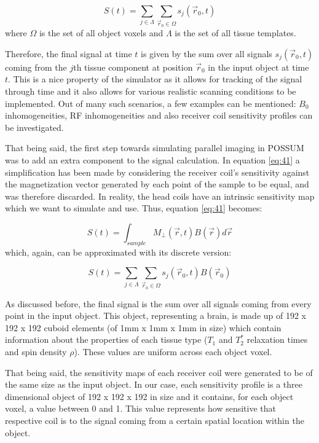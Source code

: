 \begin{equation} \label{eq:42}
    S(t) = \sum_{j \in \Lambda} \sum_{\vec{r}_0 \in \Omega} s_j (\vec{r}_0, t)
\end{equation}
where $\Omega$ is the set of all object voxels and $\Lambda$ is the set of all tissue templates. 

Therefore, the final signal at time $t$ is given by the sum over all signals $s_j (\vec{r}_0, t)$ coming from the $j$th tissue component at position $\vec{r}_0$ in the input object at time $t$. This is a nice property of the simulator as it allows for tracking of the signal through time and it also allows for various realistic scanning conditions to be implemented. Out of many such scenarios, a few examples can be mentioned: $B_0$ inhomogeneities, RF inhomogeneities and also receiver coil sensitivity profiles can be investigated.

That being said, the first step towards simulating parallel imaging in POSSUM was to add an extra component to the signal calculation. In equation \ref{eq:41} a simplification has been made by considering the receiver coil's sensitivity against the magnetization vector generated by each point of the sample to be equal, and was therefore discarded. In reality, the head coils have an intrinsic sensitivity map which we want to simulate and use. Thus, equation \ref{eq:41} becomes:

\begin{equation} \label{eq:43}
    S(t) = \int_{sample} M_{\perp} (\vec{r}, t) B(\vec{r}) d \vec{r}
\end{equation}
which, again, can be approximated with its discrete version:

\begin{equation} \label{eq:44}
    S(t) = \sum_{j \in \Lambda} \sum_{\vec{r}_0 \in \Omega} s_j (\vec{r}_0, t) B(\vec{r}_0)
\end{equation}

As discussed before, the final signal is the sum over all signals coming from every point in the input object. This object, representing a brain, is made up of 192 x 192 x 192 cuboid elements (of 1mm x 1mm x 1mm in size) which contain information about the properties of each tissue type ($T_1$ and $T_2^*$ relaxation times and spin density $\rho$). These values are uniform across each object voxel. 

That being said, the sensitivity maps of each receiver coil were generated to be of the same size as the input object. In our case, each sensitivity profile is a three dimensional object of 192 x 192 x 192 in size and it contains, for each object voxel, a value between 0 and 1. This value represents how sensitive that respective coil is to the signal coming from a certain spatial location within the object.

